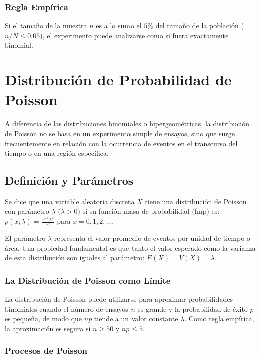 \documentclass[a4paper]{article}
\begin{document}
\subsubsection{Regla Empírica}

Si el tamaño de la muestra $n$ es a lo sumo el $5\%$ del tamaño de la población ($n/N \leq 0.05$), el experimento puede analizarse como si fuera exactamente binomial.


\section{Distribución de Probabilidad de Poisson}

A diferencia de las distribuciones binomiales o hipergeométricas, la distribución de Poisson no se basa en un experimento simple de ensayos, sino que surge frecuentemente en relación con la ocurrencia de eventos en el transcurso del tiempo o en una región específica.

\subsection{Definición y Parámetros}

Se dice que una variable aleatoria discreta $X$ tiene una distribución de Poisson con parámetro $\lambda$ ($\lambda > 0$) si su función masa de probabilidad (fmp) es:
$p(x; \lambda) = \frac{e^{-\lambda} \lambda^x}{x!}$ para $x = 0, 1, 2, \dots$.

El parámetro $\lambda$ representa el valor promedio de eventos por unidad de tiempo o área. Una propiedad fundamental es que tanto el valor esperado como la varianza de esta distribución son iguales al parámetro: $E(X) = V(X) = \lambda$.

\subsubsection{La Distribución de Poisson como Límite}

La distribución de Poisson puede utilizarse para aproximar probabilidades binomiales cuando el número de ensayos $n$ es grande y la probabilidad de éxito $p$ es pequeña, de modo que $np$ tiende a un valor constante $\lambda$. Como regla empírica, la aproximación es segura si $n \geq 50$ y $np \leq 5$.

\subsubsection{Procesos de Poisson}
\end{document}
